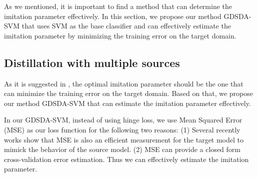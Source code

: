 As we mentioned, it is important to find a method that can determine the imitation parameter effectively. In this section, we propose our method GDSDA-SVM that uses SVM as the base classifier and can effectively estimate the imitation parameter by minimizing the training error on the target domain.
\subsection{Distillation with multiple sources}
As it is suggested in \cite{vapnik2015learning}, the optimal imitation parameter should be the one that can minimize the training error on the target domain. Based on that, we propose our method GDSDA-SVM that can estimate the imitation parameter effectively.

In our GDSDA-SVM, instead of using hinge loss, we use Mean Squared Error (MSE) as our loss function for the following two reasons: (1) Several recently works \cite{ba2014deep,luo2016face,romero2014fitnets,urban2016deep} show that MSE is also an efficient measurement for the target model to mimick the behavior of the source model. (2) MSE can provide a closed form cross-validation error estimation. Thus we can effectively estimate the imitation parameter. 

